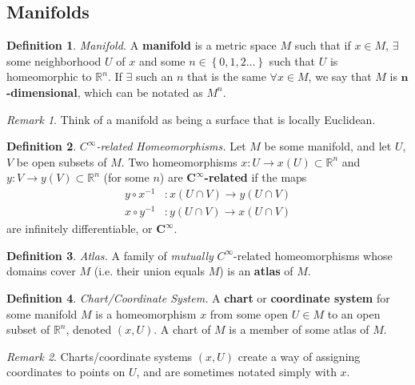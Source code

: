 \documentclass[10pt,landscape]{article}
\theoremstyle{definition}
\newtheorem{definition}{Definition}[section]
\theoremstyle{theorem}
\theoremstyle{summary}
\theoremstyle{remark}
\newtheorem*{remark}{Remark}
\newcommand{\Rn}{\mathbb{R}^n}
\newcommand{\Ci}{C^\infty}
\begin{document}
\begin{multicols*}{3}
\section{Manifolds}

\theoremstyle{definition}
\begin{definition}{\textit{Manifold.}}
A \textbf{manifold} is a metric space $M$ such that if $x\in M$, $\exists$ some neighborhood $U$ of $x$ and some $n\in\left\{0,1,2\ldots\right\}$ such that $U$ is homeomorphic to $\Rn$. If $\exists$ such an $n$ that is the same $\forall x\in M$, we say that $M$ is \textbf{$\bm{n}$-dimensional}, which can be notated as $M^n$.
\end{definition}

\begin{remark}
Think of a manifold as being a surface that is locally Euclidean.
\end{remark}

\theoremstyle{definition}
\begin{definition}{\textit{$C^\infty$-related Homeomorphisms.}}
Let $M$ be some manifold, and let $U$, $V$ be open subsets of $M$. Two homeomorphisms $x:U\rightarrow x(U)\subset\Rn$ and $y:V\rightarrow y(V) \subset \Rn$ (for some $n$) are $\bm{\Ci}$\textbf{-related} if the maps
\begin{align}
    y \circ x^{-1} &: x(U\cap V) \rightarrow y(U\cap V)\\
    x \circ y^{-1} &: y(U\cap V) \rightarrow x(U\cap V)
\end{align}
are infinitely differentiable, or $\bm{\Ci}$.
\end{definition}

\theoremstyle{definition}
\begin{definition}{\textit{Atlas.}}
A family of \textit{mutually} $\Ci$-related homeomorphisms whose domains cover $M$ (i.e. their union equals $M$) is an \textbf{atlas} of $M$.
\end{definition}

\theoremstyle{definition}
\begin{definition}{\textit{Chart/Coordinate System.}}
A \textbf{chart} or \textbf{coordinate system} for some manifold $M$ is a homeomorphism $x$ from some open $U\in M$ to an open subset of $\Rn$, denoted $(x, U)$. A chart of $M$ is a member of some atlas of $M$.
\end{definition}

\begin{remark}
Charts/coordinate systems $(x, U)$ create a way of assigning coordinates to points on $U$, and are sometimes notated simply with $x$.
\end{remark}


\end{multicols*}
\end{document}
